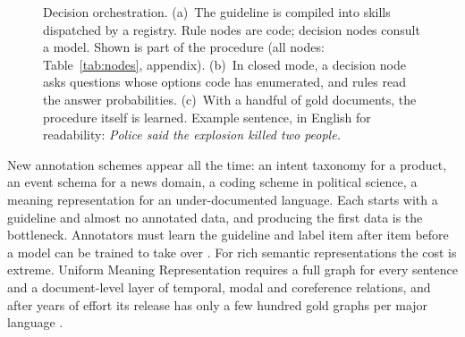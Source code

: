 \begin{figure}[t]
{}
\caption{Decision orchestration. (a)~The guideline is compiled into skills dispatched by a registry. Rule nodes are code; decision nodes consult a model. Shown is part of the \umr procedure (all nodes: Table~\ref{tab:nodes}, appendix). (b)~In closed mode, a decision node asks questions whose options code has enumerated, and rules read the answer probabilities. (c)~With a handful of gold documents, the procedure itself is learned. Example sentence, in English for readability: \emph{Police said the explosion killed two people.}}
\label{fig:overview}
\end{figure}

New annotation schemes appear all the time: an intent taxonomy for a product, an event schema for a news domain, a coding scheme in political science, a meaning representation for an under-documented language. Each starts with a guideline and almost no annotated data, and producing the first data is the bottleneck. Annotators must learn the guideline and label item after item before a model can be trained to take over \citep{settles2009active}. For rich semantic representations the cost is extreme. Uniform Meaning Representation \citep[\umr;][]{gysel2021design} requires a full graph for every sentence and a document-level layer of temporal, modal and coreference relations, and after years of effort its release has only a few hundred gold graphs per major language \citep{bonn2025umr2}.

